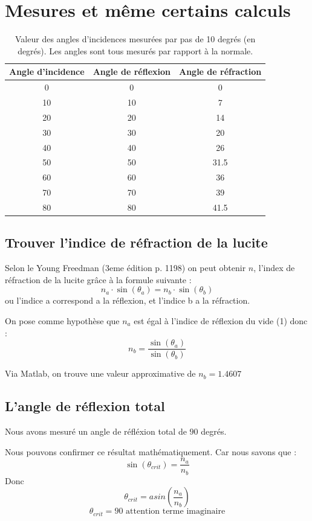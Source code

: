 \documentclass[a4paper,11pt]{article}
\begin{document}
\section{Mesures et même certains calculs} 
\begin{table}[!h]
	\begin{center}
	\begin{tabular}{|c|c|c|}
	\hline
		Angle d'incidence & Angle de réflexion & Angle de réfraction \\
	\hline
		0 & 0 & 0 \\
		10 & 10 & 7 \\
		20 & 20 & 14 \\
		30 & 30 & 20 \\
		40 & 40 & 26 \\
		50 & 50 & 31.5 \\
		60 & 60 & 36 \\
		70 & 70 & 39 \\
		80 & 80 & 41.5 \\
	\hline
	\end{tabular}
	\end{center}
	\caption{Valeur des angles d'incidences mesurées par pas de 10 degrés (en degrés). Les angles sont tous mesurés par rapport à la normale.}
\end{table}
\subsection{Trouver l'indice de réfraction de la lucite}

Selon le Young Freedman (3eme édition p. 1198) on peut obtenir $n$, l'index de réfraction de la lucite grâce à la formule suivante : 
$$ n_a \cdot \sin (\theta_a) = n_b \cdot \sin (\theta_b)$$
ou l'indice a correspond a la réflexion, et l'indice b a la réfraction.

On pose comme hypothèse que $n_a$ est égal à l'indice de réflexion du vide (1) donc :
$$ n_b = \frac{\sin (\theta_a)}{\sin (\theta_b)} $$

Via Matlab, on trouve une valeur approximative de $n_b = 1.4607$

\subsection{L'angle de réflexion total}
Nous avons mesuré un angle de réfléxion total de $90$ degrés.

Nous pouvons confirmer ce résultat mathématiquement. Car nous savons que :
$$ \sin (\theta_{crit} ) = \frac{n_a}{n_b} $$
Donc $$ \theta_{crit} = asin (\frac{n_a}{n_b} ) $$
$$ \theta_{crit} = 90 \text{ attention terme imaginaire}$$
\end{document}
